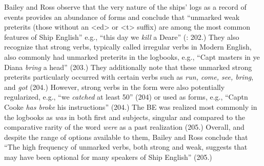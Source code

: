 Bailey and Ross observe that the very nature of the ships’ logs as a record of events provides an abundance of  forms and conclude that “unmarked weak preterits (those without an <ed> or <t> suffix) are among the most common features of Ship English” e.g., “this day we \textit{kill} a Deare” (\citeyear*{BaileyRoss1988}: 202.) They also recognize that strong verbs, typically called irregular verbs in Modern English, also commonly had unmarked preterits in the logbooks, e.g., “Capt masters in ye Diana \textit{bring} a head” (203.) They additionally note that these unmarked strong preterits particularly occurred with certain verbs such as \textit{run, come, see, bring}, and \textit{got} (204.) However, strong verbs in the  form were also potentially regularized, e.g., “we \textit{catched} at least 50” (204) or used as  forms, e.g., “Captn Cooke \textit{has broke} his instructions” (204.) The  BE was realized most commonly in the logbooks as \textit{was} in both first and  subjects, singular and  compared to the comparative rarity of the word \textit{were} as a past realization (205.) Overall, and despite the range of options available to them, Bailey and Ross conclude that “The high frequency of unmarked verbs, both strong and weak, suggests that  may have been optional for many speakers of Ship English” (205.) 

